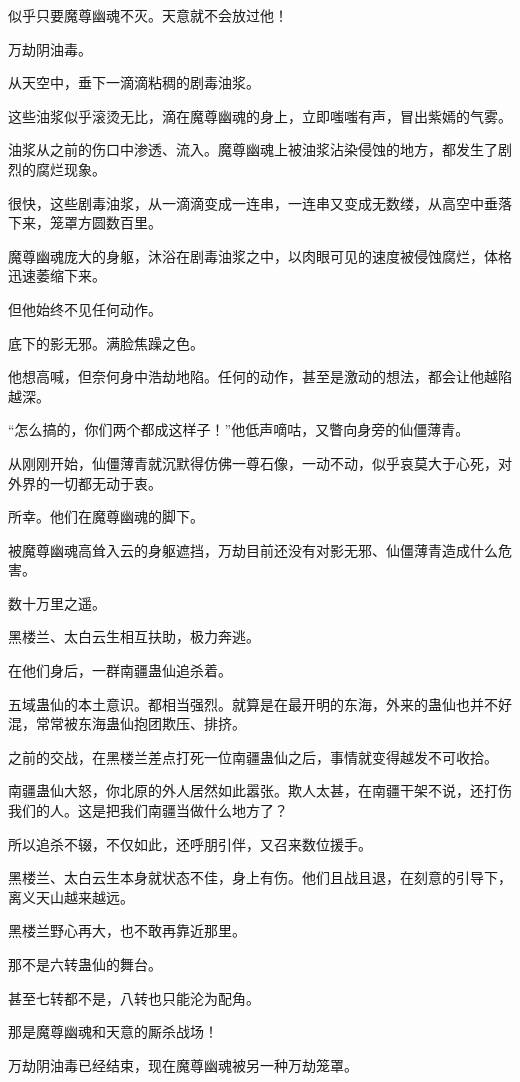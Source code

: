 \begin{this_body}
似乎只要魔尊幽魂不灭。天意就不会放过他！

万劫阴油毒。

从天空中，垂下一滴滴粘稠的剧毒油浆。

这些油浆似乎滚烫无比，滴在魔尊幽魂的身上，立即嗤嗤有声，冒出紫嫣的气雾。

油浆从之前的伤口中渗透、流入。魔尊幽魂上被油浆沾染侵蚀的地方，都发生了剧烈的腐烂现象。

很快，这些剧毒油浆，从一滴滴变成一连串，一连串又变成无数缕，从高空中垂落下来，笼罩方圆数百里。

魔尊幽魂庞大的身躯，沐浴在剧毒油浆之中，以肉眼可见的速度被侵蚀腐烂，体格迅速萎缩下来。

但他始终不见任何动作。

底下的影无邪。满脸焦躁之色。

他想高喊，但奈何身中浩劫地陷。任何的动作，甚至是激动的想法，都会让他越陷越深。

“怎么搞的，你们两个都成这样子！”他低声嘀咕，又瞥向身旁的仙僵薄青。

从刚刚开始，仙僵薄青就沉默得仿佛一尊石像，一动不动，似乎哀莫大于心死，对外界的一切都无动于衷。

所幸。他们在魔尊幽魂的脚下。

被魔尊幽魂高耸入云的身躯遮挡，万劫目前还没有对影无邪、仙僵薄青造成什么危害。

数十万里之遥。

黑楼兰、太白云生相互扶助，极力奔逃。

在他们身后，一群南疆蛊仙追杀着。

五域蛊仙的本土意识。都相当强烈。就算是在最开明的东海，外来的蛊仙也并不好混，常常被东海蛊仙抱团欺压、排挤。

之前的交战，在黑楼兰差点打死一位南疆蛊仙之后，事情就变得越发不可收拾。

南疆蛊仙大怒，你北原的外人居然如此嚣张。欺人太甚，在南疆干架不说，还打伤我们的人。这是把我们南疆当做什么地方了？

所以追杀不辍，不仅如此，还呼朋引伴，又召来数位援手。

黑楼兰、太白云生本身就状态不佳，身上有伤。他们且战且退，在刻意的引导下，离义天山越来越远。

黑楼兰野心再大，也不敢再靠近那里。

那不是六转蛊仙的舞台。

甚至七转都不是，八转也只能沦为配角。

那是魔尊幽魂和天意的厮杀战场！

万劫阴油毒已经结束，现在魔尊幽魂被另一种万劫笼罩。


\end{this_body}

